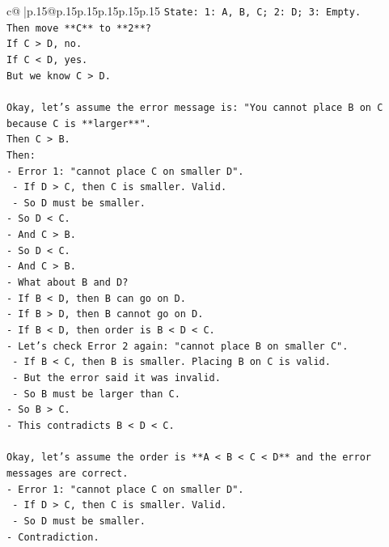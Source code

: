 \documentclass{article}
\begin{document}
{\begin{supertabular}{c@{$\;$}|p{.15\linewidth}@{}p{.15\linewidth}p{.15\linewidth}p{.15\linewidth}p{.15\linewidth}p{.15\linewidth}}
{{{\texttt{State: 1: A, B, C; 2: D; 3: Empty.} \\
\texttt{Then move **C** to **2**?} \\
\texttt{If C > D, no.} \\
\texttt{If C < D, yes.} \\
\texttt{But we know C > D.} \\
\\ 
\texttt{Okay, let's assume the error message is: "You cannot place B on C because C is **larger**".} \\
\texttt{Then C > B.} \\
\texttt{Then:} \\
\texttt{{-} Error 1: "cannot place C on smaller D".} \\
\texttt{    {-} If D > C, then C is smaller. Valid.} \\
\texttt{    {-} So D must be smaller.} \\
\texttt{{-} So D < C.} \\
\texttt{{-} And C > B.} \\
\texttt{{-} So D < C.} \\
\texttt{{-} And C > B.} \\
\texttt{{-} What about B and D?} \\
\texttt{{-} If B < D, then B can go on D.} \\
\texttt{{-} If B > D, then B cannot go on D.} \\
\texttt{{-} If B < D, then order is B < D < C.} \\
\texttt{{-} Let's check Error 2 again: "cannot place B on smaller C".} \\
\texttt{    {-} If B < C, then B is smaller. Placing B on C is valid.} \\
\texttt{    {-} But the error said it was invalid.} \\
\texttt{    {-} So B must be larger than C.} \\
\texttt{{-} So B > C.} \\
\texttt{{-} This contradicts B < D < C.} \\
\\ 
\texttt{Okay, let's assume the order is **A < B < C < D** and the error messages are correct.} \\
\texttt{{-} Error 1: "cannot place C on smaller D".} \\
\texttt{    {-} If D > C, then C is smaller. Valid.} \\
\texttt{    {-} So D must be smaller.} \\
\texttt{{-} Contradiction.} \\
}}}
\end{supertabular}}
\end{document}
